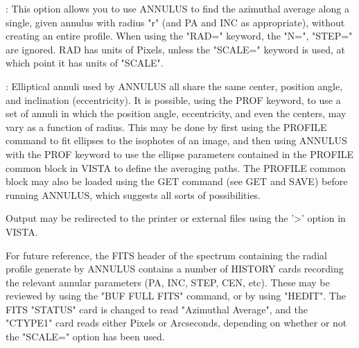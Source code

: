 :\newline
This option allows you to use ANNULUS to find the azimuthal average along a
single, given annulus with radius "r" (and PA and INC as appropriate),
without creating an entire profile.  When using the "RAD=" keyword, the
"N=", "STEP=" are ignored.  RAD has units of Pixels, unless the "SCALE="
keyword is used, at which point it has  units of "SCALE". 

:\newline
Elliptical annuli used by ANNULUS all share the same center, position
angle, and inclination (eccentricity).  It is possible, using the PROF
keyword, to use a set of annuli in which the position angle, eccentricity,
and even the centers, may vary as a function of radius.  This may be done
by first using the PROFILE command to fit ellipses to the isophotes of an
image, and then using ANNULUS with the PROF keyword to use the ellipse
parameters contained in the PROFILE common block in VISTA to define the
averaging paths.  The PROFILE common block may also be loaded using the GET
command (see GET and SAVE) before running ANNULUS, which suggests all sorts
of possibilities.


Output may be redirected to the printer or external files using the '>'
option in VISTA.

For future reference, the FITS header of the spectrum containing the radial
profile generate by ANNULUS contains a number of HISTORY cards recording
the relevant annular parameters (PA, INC, STEP, CEN, etc).  These may be
reviewed by using the "BUF FULL FITS" command, or by using "HEDIT".  The
FITS "STATUS" card is changed to read "Azimuthal Average", and the "CTYPE1"
card reads either Pixels or Arcseconds, depending on whether or not the
"SCALE=" option has been used.


